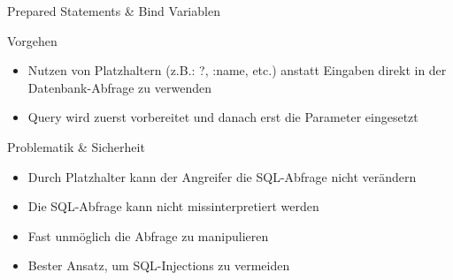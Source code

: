 \begin{frame}{Prepared Statements \& Bind Variablen}
\begin{block}{Vorgehen}
\begin{itemize}
\item Nutzen von Platzhaltern (z.B.: ?, :name, etc.) anstatt Eingaben direkt in der Datenbank-Abfrage zu verwenden
\item Query wird zuerst vorbereitet und danach erst die Parameter eingesetzt
\end{itemize}
\end{block}
\begin{block}{Problematik \& Sicherheit}
\begin{itemize}
	\item Durch Platzhalter kann der Angreifer die SQL-Abfrage nicht verändern
	\item Die SQL-Abfrage kann nicht missinterpretiert werden
	\item Fast unmöglich die Abfrage zu manipulieren
	\item Bester Ansatz, um SQL-Injections zu vermeiden
\end{itemize}
\end{block}
\end{frame}


